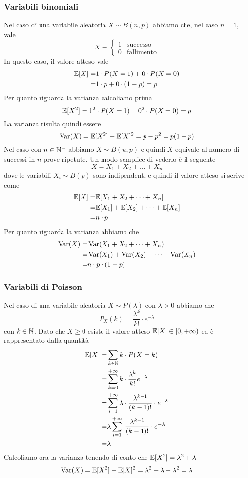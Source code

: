 \subsubsection{Variabili binomiali}
Nel caso di una variabile aleatoria $X \sim B(n,p)$ abbiamo che, nel caso $n=1$, vale
\[
	X = \begin{cases}
		1 & \text{successo}   \\
		0 & \text{fallimento}
	\end{cases}
\]
In questo caso, il valore atteso vale
\begin{align*}
	\mathbb{E}[X] = & 1 \cdot P(X = 1) + 0 \cdot P(X = 0) \\
	=       & 1 \cdot p + 0 \cdot (1-p) = p
\end{align*}
Per quanto riguarda la varianza calcoliamo prima
\[ \mathbb{E}[X^2] = 1^2 \cdot P(X=1) + 0^2 \cdot P(X = 0) = p \]
La varianza risulta quindi essere
\[ \operatorname{Var}(X) = \mathbb{E}[X^2] - \mathbb{E}[X]^2 = p - p^2 = p(1-p) \]
Nel caso con $n \in \mathbb{N}^+$ abbiamo $X \sim B(n,p)$ e quindi $X$ equivale al numero di successi in
$n$ prove ripetute. Un modo semplice di vederlo è il seguente
\[ X = X_1 + X_2 + \dots + X_n \]
dove le variabili $X_i \sim B(p)$ sono indipendenti e quindi il valore atteso si scrive come
\begin{align*}
	\mathbb{E}[X] = & \mathbb{E}[X_1 + X_2 + \dots + X_n]         \\
	=       & \mathbb{E}[X_1] + \mathbb{E}[X_2] + \dots + \mathbb{E}[X_n] \\
	=       & n \cdot p
\end{align*}
Per quanto riguarda la varianza abbiamo che
\begin{align*}
	\operatorname{Var}(X) = & \operatorname{Var}(X_1 + X_2 + \dots + X_n)             \\
	=         & \operatorname{Var}(X_1) + \operatorname{Var}(X_2) + \dots + \operatorname{Var}(X_n) \\
	=         & n \cdot p \cdot (1-p)
\end{align*}

\subsubsection{Variabili di Poisson}
Nel caso di una variabile aleatoria $X \sim P(\lambda)$ con $\lambda > 0$ abbiamo che
\[ P_X (k) = \frac{\lambda^k}{k!} \cdot e^{-\lambda} \]
con $k \in \mathbb{N}$. Dato che $X \geq 0$ esiste il valore atteso $\mathbb{E}[X] \in [0, +\infty)$ ed è
rappresentato dalla quantità
\begin{align*}
	\mathbb{E}[X] = & \sum_{k \in \mathbb{N}} k \cdot P(X = k)                                                   \\
	=       & \sum_{k=0}^{+\infty} k \cdot \frac{\lambda^k}{k!} e^{-\lambda}                     \\
	=       & \sum_{i=1}^{+\infty} \lambda \cdot \frac{\lambda^{k-1}}{(k-1)!} \cdot e^{-\lambda} \\
	=       & \lambda \sum_{i=1}^{+\infty} \cdot \frac{\lambda^{k-1}}{(k-1)!} \cdot e^{-\lambda} \\
	=       & \lambda
\end{align*}
Calcoliamo ora la varianza tenendo di conto che $\mathbb{E}[X^2] = \lambda^2 + \lambda$
\[ \operatorname{Var}(X) = \mathbb{E}[X^2] - \mathbb{E}[X]^2 = \lambda^2 + \lambda - \lambda^2 = \lambda \]

